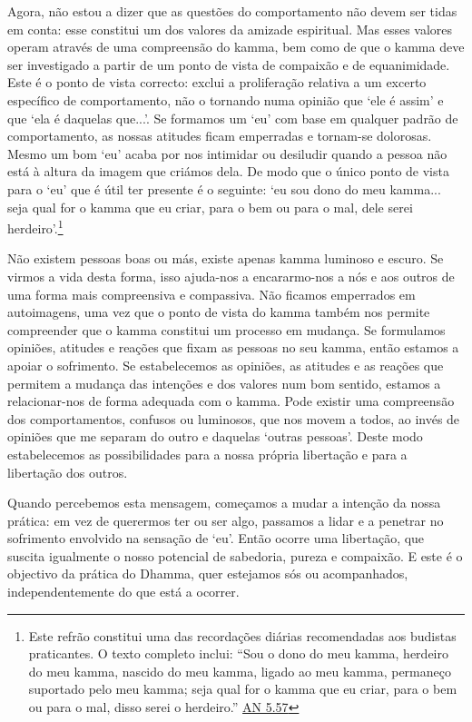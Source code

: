 Agora, não estou a dizer que as questões do comportamento não devem ser tidas em conta: esse constitui um dos valores da amizade espiritual. Mas esses valores operam através de uma compreensão do kamma, bem como de que o kamma deve ser investigado a partir de um ponto de vista de compaixão e de equanimidade. Este é o ponto de vista correcto: exclui a proliferação relativa a um excerto específico de comportamento, não o tornando numa opinião que `ele é assim' e que `ela é daquelas que...'. Se formamos um `eu' com base em qualquer padrão de comportamento, as nossas atitudes ficam emperradas e tornam-se dolorosas. Mesmo um bom `eu' acaba por nos intimidar ou desiludir quando a pessoa não está à altura da imagem que criámos dela. De modo que o único ponto de vista para o `eu' que é útil ter presente é o seguinte: `eu sou dono do meu kamma... seja qual for o kamma que eu criar, para o bem ou para o mal, dele serei herdeiro'.\footnote{Este refrão constitui uma das recordações diárias recomendadas aos budistas praticantes. O texto completo inclui: ``Sou o dono do meu kamma, herdeiro do meu kamma, nascido do meu kamma, ligado ao meu kamma, permaneço suportado pelo meu kamma; seja qual for o kamma que eu criar, para o bem ou para o mal, disso serei o herdeiro.'' \href{https://suttacentral.net/an5.57/en/bodhi}{AN 5.57}}

Não existem pessoas boas ou más, existe apenas kamma luminoso e escuro. Se virmos a vida desta forma, isso ajuda-nos a encararmo-nos a nós e aos outros de uma forma mais compreensiva e compassiva. Não ficamos emperrados em autoimagens, uma vez que o ponto de vista do kamma também nos permite compreender que o kamma constitui um processo em mudança. Se formulamos opiniões, atitudes e reações que fixam as pessoas no seu kamma, então estamos a apoiar o sofrimento. Se estabelecemos as opiniões, as atitudes e as reações que permitem a mudança das intenções e dos valores num bom sentido, estamos a relacionar-nos de forma adequada com o kamma. Pode existir uma compreensão dos comportamentos, confusos ou luminosos, que nos movem a todos, ao invés de opiniões que me separam do outro e daquelas `outras pessoas'. Deste modo estabelecemos as possibilidades para a nossa própria libertação e para a libertação dos outros.

Quando percebemos esta mensagem, começamos a mudar a intenção da nossa prática: em vez de querermos ter ou ser algo, passamos a lidar e a penetrar no sofrimento envolvido na sensação de `eu'. Então ocorre uma libertação, que suscita igualmente o nosso potencial de sabedoria, pureza e compaixão. E este é o objectivo da prática do Dhamma, quer estejamos sós ou acompanhados, independentemente do que está a ocorrer.

